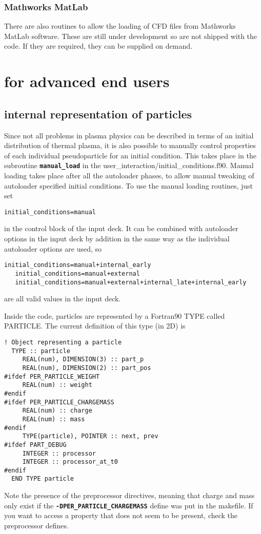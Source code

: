 \documentclass[12pt,a4paper]{article}
\newcommand{\simpleboxverbatim}{\begin{Verbatim}[obeytabs=true,frame=single,
  framerule=0.5mm,rulecolor=\color{warwickmid},formatcom=\color{black}]}
\newcommand{\inlinecode}[1]{{\color{warwickred} \bf\texttt{#1}}}
\newcommand{\EPOCH}{{\color{warwickdark}\fontfamily{phv}\selectfont{EPOCH}}}
\begin{document}
\subsubsection{Mathworks MatLab}
There are also routines to allow the loading of CFD files from Mathworks
MatLab software. These are still under development so are not shipped with the
code. If they are required, they can be supplied on demand.

\section{{\EPOCH} for advanced end users}

\subsection{{\EPOCH} internal representation of particles}
Since not all problems in plasma physics can be described in terms of an
initial distribution of thermal plasma, it is also possible to manually
control properties of each individual pseudoparticle for an initial
condition. This takes place in the subroutine \inlinecode{manual\_load} in the
user\_interaction/initial\_conditions.f90. Manual loading takes place after
all the autoloader phases, to allow manual tweaking of autoloader specified
initial conditions. To use the manual loading routines, just set\\
\simpleboxverbatim
   initial_conditions=manual
\end{Verbatim}
in the control block of the input deck. It can be combined with autoloader
options in the input deck by addition in the same way as the individual
autoloader options are used, so
\simpleboxverbatim
   initial_conditions=manual+internal_early
   initial_conditions=manual+external
   initial_conditions=manual+external+internal_late+internal_early
\end{Verbatim}
are all valid values in the input deck.

Inside the code, particles are represented by a Fortran90 TYPE called
PARTICLE. The current definition of this type (in 2D) is

\simpleboxverbatim
! Object representing a particle
  TYPE :: particle
     REAL(num), DIMENSION(3) :: part_p
     REAL(num), DIMENSION(2) :: part_pos
#ifdef PER_PARTICLE_WEIGHT
     REAL(num) :: weight
#endif
#ifdef PER_PARTICLE_CHARGEMASS
     REAL(num) :: charge
     REAL(num) :: mass
#endif
     TYPE(particle), POINTER :: next, prev
#ifdef PART_DEBUG
     INTEGER :: processor
     INTEGER :: processor_at_t0
#endif
  END TYPE particle
\end{Verbatim}
Note the presence of the preprocessor directives, meaning that charge and mass
only exist if the \inlinecode{-DPER\_PARTICLE\_CHARGEMASS} define was put in
the makefile. If you want to access a property that does not seem to be
present, check the preprocessor defines.
\end{document}
